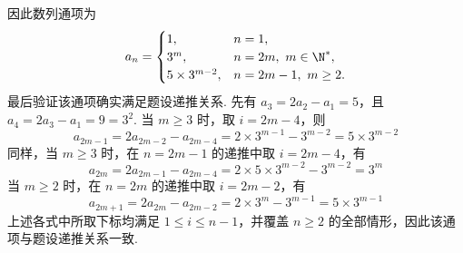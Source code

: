 \begin{solution}
\begin{enumerate}
因此数列通项为
\[
a_n=\begin{cases}
1,&n=1,\\
3^m,&n=2m,\ m\in\N^*,\\
5\times3^{m-2},&n=2m-1,\ m\ge2.
\end{cases}
\]
最后验证该通项确实满足题设递推关系. 先有 \(a_3=2a_2-a_1=5\)，且 \(a_4=2a_3-a_1=9=3^2\). 当 \(m\ge3\) 时，取 \(i=2m-4\)，则
\[
a_{2m-1}=2a_{2m-2}-a_{2m-4}=2\times3^{m-1}-3^{m-2}=5\times3^{m-2}
\]
同样，当 \(m\ge3\) 时，在 \(n=2m-1\) 的递推中取 \(i=2m-4\)，有
\[
a_{2m}=2a_{2m-1}-a_{2m-4}=2\times5\times3^{m-2}-3^{m-2}=3^m
\]
当 \(m\ge2\) 时，在 \(n=2m\) 的递推中取 \(i=2m-2\)，有
\[
a_{2m+1}=2a_{2m}-a_{2m-2}=2\times3^m-3^{m-1}=5\times3^{m-1}
\]
上述各式中所取下标均满足 \(1\le i\le n-1\)，并覆盖 \(n\ge2\) 的全部情形，因此该通项与题设递推关系一致.
\end{enumerate}
\end{solution}
